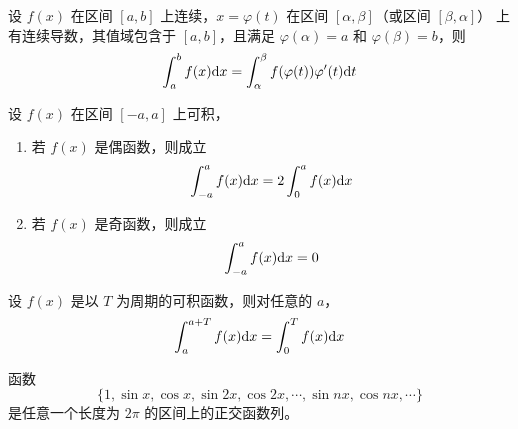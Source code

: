 \documentclass{ctexbook}
\def\diff{\textnormal{d}}
\begin{document}
\begin{theorem}[换元积分法]
    设 $f(x)$ 在区间 $[a,b]$ 上连续，$x=\varphi(t)$ 在区间 $[\alpha,\beta]$（或区间 $[\beta,\alpha]$） 上有连续导数，其值域包含于 $[a,b]$，且满足 $\varphi(\alpha)=a$ 和 $\varphi(\beta)=b$，则
    \begin{equation}
        \int_a^b f(x)\diff x=\int_\alpha^\beta f(\varphi(t))\varphi^\prime(t)\diff t
    \end{equation}
\end{theorem}

\begin{theorem}[奇偶函数的积分]
    设 $f(x)$ 在区间 $[-a,a]$ 上可积，
    \begin{enumerate}
        \item 若 $f(x)$ 是偶函数，则成立
        \begin{equation}
            \int_{-a}^a f(x)\diff x=2\int_0^a f(x)\diff x
        \end{equation}
        \item 若 $f(x)$ 是奇函数，则成立
        \begin{equation}
            \int_{-a}^a f(x)\diff x=0
        \end{equation}
    \end{enumerate}
\end{theorem}

\begin{theorem}[周期函数的积分]
    设 $f(x)$ 是以 $T$ 为周期的可积函数，则对任意的 $a$，
    \begin{equation}
        \int_a^{a+T}f(x)\diff x=\int_0^T f(x)\diff x
    \end{equation}
\end{theorem}

\begin{proposition}[三角函数正交函数列]
    函数 
    \begin{equation}
        \{1,\sin x,\cos x,\sin 2x,\cos 2x,\cdots,\sin nx,\cos nx,\cdots\}        
    \end{equation}
    是任意一个长度为 $2\pi$ 的区间上的正交函数列。
\end{proposition}
\end{document}
